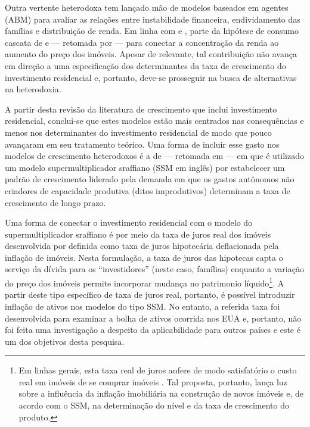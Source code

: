 Outra vertente heterodoxa tem lançado mão de modelos baseados em agentes (ABM) para avaliar as relações entre instabilidade financeira, endividamento das famílias e distribuição de renda.
Em linha com \textcite{cynamon_inequality_2013} e \textcite{erlingsson_integrating_2013}, \textcite{cardaci_inequality_2018} parte da hipótese de consumo cascata de \textcite{veblen_theory_1899} e \textcite{duesenberry_income_1949} --- retomada por \textcite{frank_expenditure_2014} --- para conectar a concentração da renda ao aumento do preço dos imóveis.
Apesar de relevante, tal contribuição não avança em direção a uma especificação dos determinantes da taxa de crescimento do investimento residencial e, portanto, deve-se prosseguir na busca de alternativas na heterodoxia.

A partir desta revisão da literatura de crescimento que inclui investimento residencial, 
conclui-se que estes modelos estão mais centrados nas consequências e menos nos determinantes do investimento residencial de modo que pouco avançaram em seu tratamento teórico.
Uma forma de incluir esse gasto nos modelos de crescimento heterodoxos é a de \textcite{teixeira_crescimento_2015} --- retomada em \textcite{da_silveira_investimento_2019} --- em que é utilizado um modelo supermultiplicador sraffiano (SSM em inglês) por estabelecer um padrão de crescimento liderado pela demanda em que os gastos autônomos não criadores de capacidade produtiva (ditos improdutivos) determinam a taxa de crescimento de longo prazo. 

Uma forma de conectar o investimento residencial com o modelo do supermultiplicador sraffiano é por meio da taxa de juros real dos imóveis desenvolvida por \textcite{teixeira_crescimento_2015} definida como taxa de juros hipotecária deflacionada pela inflação de imóveis. 
Nesta formulação, a taxa de juros das hipotecas capta o serviço da dívida para os ``investidores'' (neste caso, famílias) enquanto a variação do preço dos imóveis permite incorporar mudança no patrimonio líquido\footnote{Em linhas gerais, esta taxa real de juros aufere de modo satisfatório o custo real em imóveis de se comprar imóveis \cite[p.~53]{teixeira_crescimento_2015}. Tal proposta, portanto, lança luz sobre a influência da inflação imobiliária na construção de novos imóveis e, de acordo com o SSM, na determinação do nível e da taxa de crescimento do produto.}. 
A partir deste tipo específico de taxa de juros real, portanto, é possível introduzir inflação de ativos nos modelos do tipo SSM. No entanto, a referida taxa foi desenvolvida para examinar a bolha de ativos ocorrida nos EUA e, portanto, não foi feita uma investigação a despeito da aplicabilidade para outros países e este é um dos objetivos desta pesquisa.


